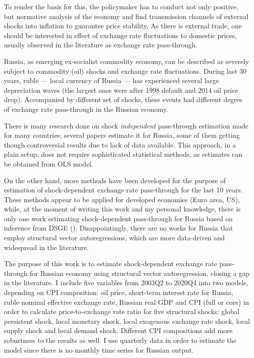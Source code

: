 \documentclass[12pt, a4paper]{extarticle}
\begin{document}
To render the basis for this, the policymaker has to conduct not only positive, but normative analysis of the economy and find transmission channels of external shocks into inflation to guarantee price stability. As there is external trade, one should be interested in effect of exchange rate fluctuations to domestic prices, usually observed in the literature as exchange rate pass-through.

Russia, as emerging ex-socialist commodity economy, can be described as severely subject to commodity (oil) shocks and exchange rate fluctuations. During last 30 years, ruble --- local currency of Russia --- has experienced several large depreciation waves (the largest ones were after 1998 default and 2014 oil price drop). Accompanied by different set of shocks, these events had different degree of exchange rate pass-through in the Russian economy. 

There is many research done on shock \textit{independent} pass-through estimation made for many countries; several papers estimate it for Russia, some of them getting though controversial results due to lack of data available. This approach, in a plain setup, does not require sophisticated statistical methods, as estimates can be obtained from OLS model.

On the other hand, more methods have been developed for the purpose of estimation of shock-dependent exchange rate pass-through for the last 10 years. These methods appear to be applied for developed economies (Euro area, US), while, at the moment of writing this work and my personal knowledge, there is only one work estimating shock-dependent pass-through for Russia based on inference from DSGE (\cite{Khotulev2020}). Disappointingly, there are no works for Russia that employ structural vector autoregressions, which are more data-driven and widespread in the literature.

The purpose of this work is to estimate shock-dependent exchange rate pass-through for Russian economy using structural vector autoregression, closing a gap in the literature. I include five variables from 2003Q2 to 2020Q4 into two models, depending on CPI composition: oil price, short-term interest rate for Russia, ruble nominal effective exchange rate, Russian real GDP and CPI (full or core) in order to calculate price-to-exchange rate ratio for five structural shocks: global persistent shock, local monetary shock, local exogenous exchange rate shock, local supply shock and local demand shock. Different CPI compositions add more robustness to the results as well. I use quarterly data in order to estimate the model since there is no monthly time series for Russian output.
\end{document}
